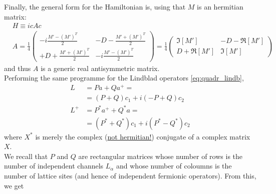 \documentclass[a4paper,11pt]{article}
\theoremstyle{remark}
\newcommand{\ubar}[1]{\underline{#1}}
\begin{document}
    Finally, the general form for the Hamiltonian is, using that $M$ is an hermitian matrix:
    \begin{subequations}
    \label{eq:quadr_ham_majorana}
    \begin{align}
     & H \equiv icAc\\
     & A = \frac{1}{4}\left(
     \begin{array}{cc}
       -i\frac{M'-(M')^T}{2} & -D - \frac{M'+(M')^T}{2} \\
       + D + \frac{M'+(M')^T}{2} & -i \frac{M'-(M')^T}{2}
        \end{array}
        \right)
      =\frac{1}{4}\left( 
      \begin{array}{cc}
        \Im[M'] & -D-\Re[M']\\
        D+\Re[M'] & \Im[M']
        \end{array}
        \right)
    \end{align}
    \end{subequations}
    and thus $A$ is a generic real antisymmetric matrix.\\[0.3cm] Performing the same programme for the Lindblad operators \eqref{eq:quadr_lindb},
    \begin{align*}
   L &= P a + Q a^+=\\
     &= (P+Q)c_1 +i(-P+Q)c_2\\
   L^+&= P^*a^++Q^*a=\\
     &= (P^*+Q^*)c_1+i(P^*-Q^*)c_2  
    \end{align*}  
   where $X^*$ is merely the complex (\ubar{not hermitian!}) conjugate of a complex matrix $X$. \\We recall that $P$ and $Q$ are rectangular matrices whose number of rows is the number of independent channels $L_{\alpha}$ and whose number of coloumns is the number of lattice sites (and hence of independent fermionic operators). From this, we get
\end{document}
